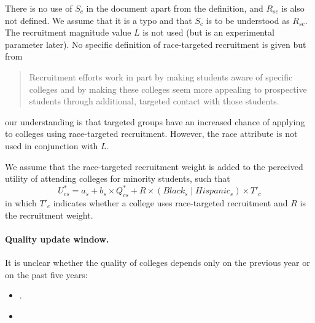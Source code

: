
There is no use of $S_c$ in the document apart from the definition, and $R_{sc}$ is also not defined.
We assume that it is a typo and that $S_c$ is to be understood as $R_{sc}$.
The recruitment magnitude value $L$ is not used (but is an experimental parameter later).
No specific definition of race-targeted recruitment is given but from \blockquote[{\cite[Section~3]{reardon2018levels}}]{Recruitment efforts work in part by making students aware of specific colleges and by making these colleges seem more appealing to prospective students through additional, targeted contact with those students.} our understanding is that targeted groups have an increased chance of applying to colleges using race-targeted recruitment.
However, the race attribute is not used in conjunction with $L$.

We assume that the race-targeted recruitment weight is added to the perceived utility of attending colleges for minority students, such that \[ U^*_{cs} = a_s + b_s \times Q^*_{cs} + R \times (Black_s \mid Hispanic_s ) \times {T'}_c \] in which ${T'}_c$ indicates whether a college uses race-targeted recruitment and $R$ is the recruitment weight.

\paragraph{Quality update window.}

It is unclear whether the quality of colleges depends only on the previous year or on the past five years:

\begin{itemize}

\item{}.

\item{}

\end{itemize}

